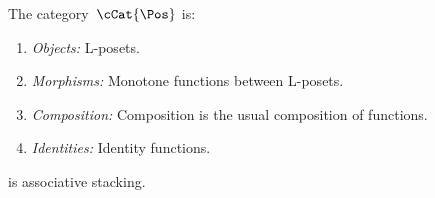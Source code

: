 \begin{definition}
    \label{def:PosL}
    The category~$\cCat{\Pos}$ is:
    \begin{enumerate}
        \item \emph{Objects:} L-posets.
        \item \emph{Morphisms:}
              Monotone functions between L-posets.
        \item \emph{Composition:}
              Composition is the usual composition of functions.
        \item \emph{Identities:}
              Identity functions.
    \end{enumerate}
\end{definition}

\begin{lemma}
    \cCat{\Pos} is associative stacking.
\end{lemma}

